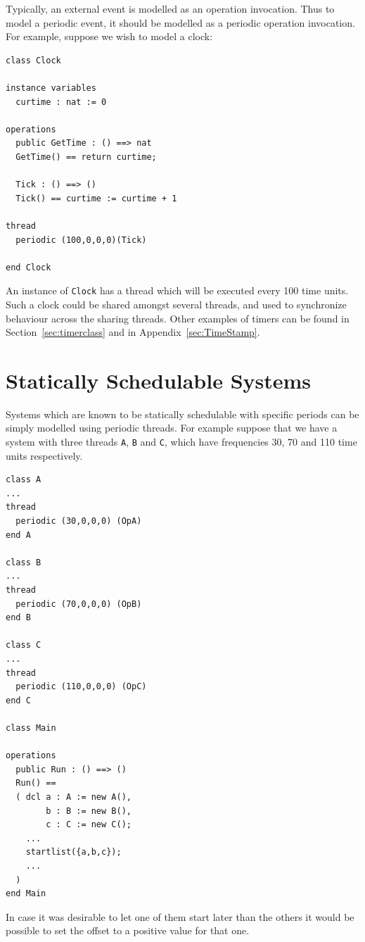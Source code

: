 \documentclass{overturerepchap}
\begin{document}
Typically, an external event is modelled as an operation
invocation. Thus to model a periodic event, it should be modelled as a
periodic operation invocation. For example, suppose we wish to model a
clock:

\begin{lstlisting}
class Clock

instance variables
  curtime : nat := 0

operations
  public GetTime : () ==> nat
  GetTime() == return curtime;

  Tick : () ==> ()
  Tick() == curtime := curtime + 1

thread
  periodic (100,0,0,0)(Tick)

end Clock
\end{lstlisting}

An instance of \texttt{Clock} has a thread which will be executed
every 100 time units. Such a clock could be shared amongst several
threads, and used to synchronize behaviour across the sharing threads. 
Other examples of timers can be found in Section~\ref{sec:timerclass} and 
in Appendix~\ref{sec:TimeStamp}.

\section{Statically Schedulable Systems}

Systems which are known to be statically schedulable with specific
periods can be simply modelled using periodic threads. For example
suppose that we have a system with three threads \texttt{A},
\texttt{B} and \texttt{C}, which have frequencies 30, 70 and 110 time
units respectively.

\begin{lstlisting}
class A
...
thread
  periodic (30,0,0,0) (OpA)
end A

class B
...
thread
  periodic (70,0,0,0) (OpB)
end B

class C
...
thread
  periodic (110,0,0,0) (OpC)
end C

class Main

operations
  public Run : () ==> ()
  Run() ==
  ( dcl a : A := new A(),
        b : B := new B(),
        c : C := new C();
    ...
    startlist({a,b,c});
    ...
  )
end Main
\end{lstlisting}

In case it was desirable to let one of them start later 
than the others it would be possible to set the offset to a positive
value for that one.
\end{document}
